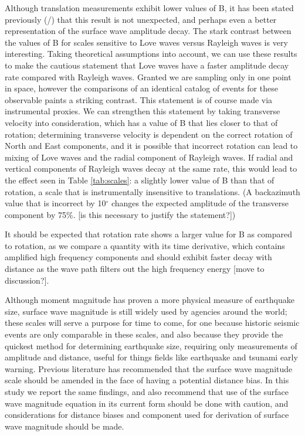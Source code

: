 \documentclass{gji}
\begin{document}
Although translation measurements exhibit lower values of B, it has been stated previously (\cite{herak1993distance}/\cite{ambraseys1997surface}) that this result is not unexpected, and perhaps even a better representation of the surface wave amplitude decay. The stark contrast between the values of B for scales sensitive to Love waves versus Rayleigh waves is very interesting. Taking theoretical assumptions into account, we can use these results to make the cautious statement that Love waves have a faster amplitude decay rate  compared with  Rayleigh waves. Granted we are sampling only in one point in space, however the comparisons of an identical catalog of events for these observable paints a striking contrast. This statement is of course made via instrumental proxies. We can strengthen this statement by taking transverse velocity into consideration, which has a value of B that lies closer to that of rotation; determining transverse velocity is dependent on the correct rotation of North and East components, and it is possible that incorrect rotation can lead to mixing of Love waves and the radial component of Rayleigh waves. If radial and vertical components of Rayleigh waves decay at the same rate, this would lead to the effect seen in Table \ref{tab:scales}: a slightly lower value of B than that of rotation, a scale that is instrumentally insensitive to translations. (A backazimuth value that is incorrect by 10$^\circ$ changes the expected amplitude of the transverse component by 75\%. [is this necessary to justify the statement?]) %

It should be expected that rotation rate shows a larger value for B as compared to rotation, as we compare a quantity with its time derivative, which contains amplified high frequency components and should exhibit faster decay with distance as the wave path filters out the high frequency energy [move to discussion?]. 

Although moment magnitude has proven a more physical measure of earthquake size, surface wave magnitude is still widely used by agencies around the world; these scales will serve a purpose for time to come, for one because historic seismic events are only comparable in these scales, and also because they provide the quickest method for determining earthquake size, requiring only measurements of amplitude and distance, useful for things fields like earthquake and tsunami early warning. Previous literature has recommended that the surface wave magnitude scale should be amended in the face of having a potential distance bias. In this study we report the same findings, and also recommend that use of the surface wave magnitude equation in its current form should be done with caution, and considerations for distance biases and component used for derivation of surface wave magnitude should be made.
\end{document}
